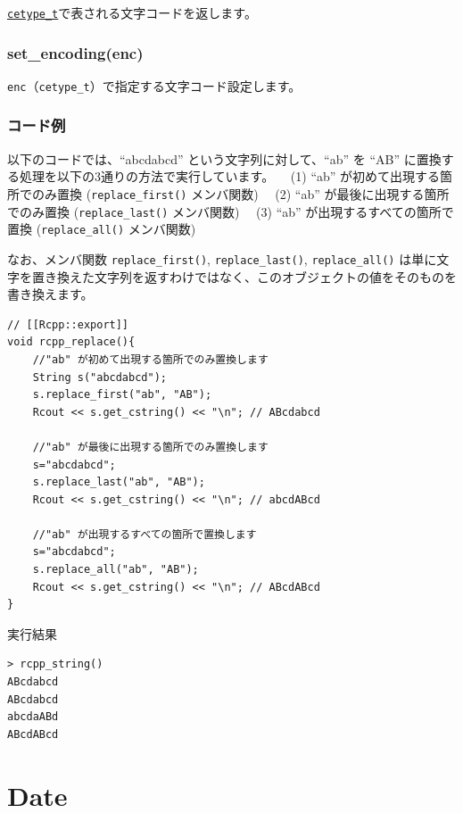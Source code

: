 \documentclass[]{book}
\begin{document}
\href{https://github.com/wch/r-source/blob/bf0a0a9d12f2ce5d66673dc32cd253524f3270bf/src/include/Rinternals.h\#L928-L935}{\texttt{cetype\_t}}で表される文字コードを返します。

\hypertarget{set_encodingenc}{%
\subsection{set\_encoding(enc)}\label{set_encodingenc}}

\texttt{enc}（\texttt{cetype\_t}）で指定する文字コード設定します。

\subsection{コード例}

以下のコードでは、``abcdabcd'' という文字列に対して、``ab'' を ``AB'' に置換する処理を以下の3通りの方法で実行しています。
　(1) ``ab'' が初めて出現する箇所でのみ置換 (\texttt{replace\_first()} メンバ関数)
　(2) ``ab'' が最後に出現する箇所でのみ置換 (\texttt{replace\_last()} メンバ関数)
　(3) ``ab'' が出現するすべての箇所で置換 (\texttt{replace\_all()} メンバ関数)

なお、メンバ関数 \texttt{replace\_first()}, \texttt{replace\_last()}, \texttt{replace\_all()} は単に文字を置き換えた文字列を返すわけではなく、このオブジェクトの値をそのものを書き換えます。

\begin{verbatim}
// [[Rcpp::export]]
void rcpp_replace(){
    //"ab" が初めて出現する箇所でのみ置換します
    String s("abcdabcd");
    s.replace_first("ab", "AB");
    Rcout << s.get_cstring() << "\n"; // ABcdabcd

    //"ab" が最後に出現する箇所でのみ置換します
    s="abcdabcd";
    s.replace_last("ab", "AB");
    Rcout << s.get_cstring() << "\n"; // abcdABcd

    //"ab" が出現するすべての箇所で置換します
    s="abcdabcd";
    s.replace_all("ab", "AB");
    Rcout << s.get_cstring() << "\n"; // ABcdABcd
}
\end{verbatim}

実行結果

\begin{verbatim}
> rcpp_string()
ABcdabcd
ABcdabcd
abcdaABd
ABcdABcd
\end{verbatim}

\hypertarget{date}{%
\chapter{Date}\label{date}}
\end{document}
